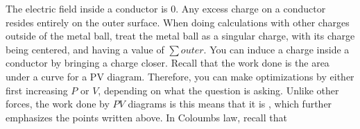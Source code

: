 \markdownRendererUlItem The electric field inside a conductor is $0$.\markdownRendererUlItemEnd 
\markdownRendererUlItem Any excess charge on a conductor resides entirely on the outer surface.\markdownRendererUlItemEnd 
\markdownRendererUlItem When doing calculations with other charges outside of the metal ball, treat the metal ball as a singular charge, with its charge being centered, and having a value of $\sum outer$.\markdownRendererUlItemEnd 
\markdownRendererUlItem You can induce a charge inside a conductor by bringing a charge closer.\markdownRendererUlItemEnd 
\markdownRendererUlEndTight \markdownRendererInterblockSeparator
{}\markdownRendererInterblockSeparator
{}\markdownRendererUlBeginTight
\markdownRendererUlItem Recall that the work done is the area under a curve for a PV diagram. Therefore, you can make optimizations by either first increasing $P$ or $V$, depending on what the question is asking.\markdownRendererUlItemEnd 
\markdownRendererUlItem Unlike other forces, the work done by $PV$ diagrams is  this means that it is , which further emphasizes the points written above.\markdownRendererUlItemEnd 
\markdownRendererUlEndTight \markdownRendererInterblockSeparator
{}\markdownRendererInterblockSeparator
{}\markdownRendererInterblockSeparator
{}\markdownRendererUlBeginTight
\markdownRendererUlItem In Coloumbs law, recall that\markdownRendererUlItemEnd 
\markdownRendererUlEndTight \relax